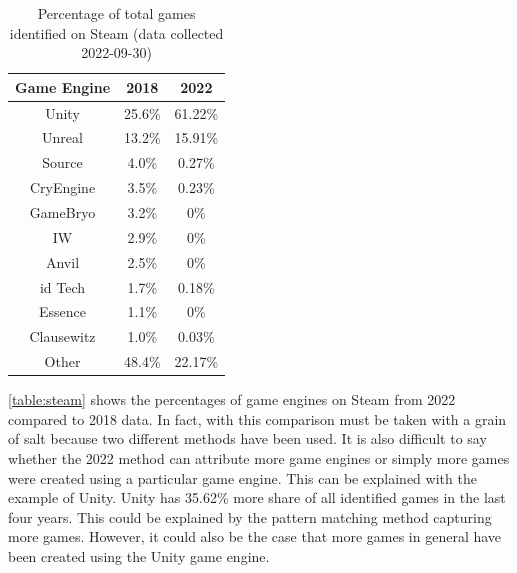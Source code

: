 \begin{table}[h!]
    \centering
    \begin{tabular}{|c c c|}
        \hline
        Game Engine & 2018   & 2022    \\
        \hline\hline
        Unity       & 25.6\% & 61.22\% \\
        Unreal      & 13.2\% & 15.91\% \\
        Source      & 4.0\%  & 0.27\%  \\
        CryEngine   & 3.5\%  & 0.23\%  \\
        GameBryo    & 3.2\%  & 0\%     \\
        IW          & 2.9\%  & 0\%     \\
        Anvil       & 2.5\%  & 0\%     \\
        id Tech     & 1.7\%  & 0.18\%  \\
        Essence     & 1.1\%  & 0\%     \\
        Clausewitz  & 1.0\%  & 0.03\%  \\
        Other       & 48.4\% & 22.17\% \\
        \hline
    \end{tabular}
    \caption{Percentage of total games identified on Steam (data collected 2022-09-30)}
    \label{table:steam}
\end{table}

\autoref{table:steam} shows the percentages of game engines on Steam from 2022 compared to 2018 data.
In fact, with this comparison must be taken with a grain of salt because two different methods have been used.
It is also difficult to say whether the 2022 method can attribute more game engines or simply more games were created using a particular game engine.
This can be explained with the example of Unity.
Unity has 35.62\% more share of all identified games in the last four years.
This could be explained by the pattern matching method capturing more games.
However, it could also be the case that more games in general have been created using the Unity game engine.\\


